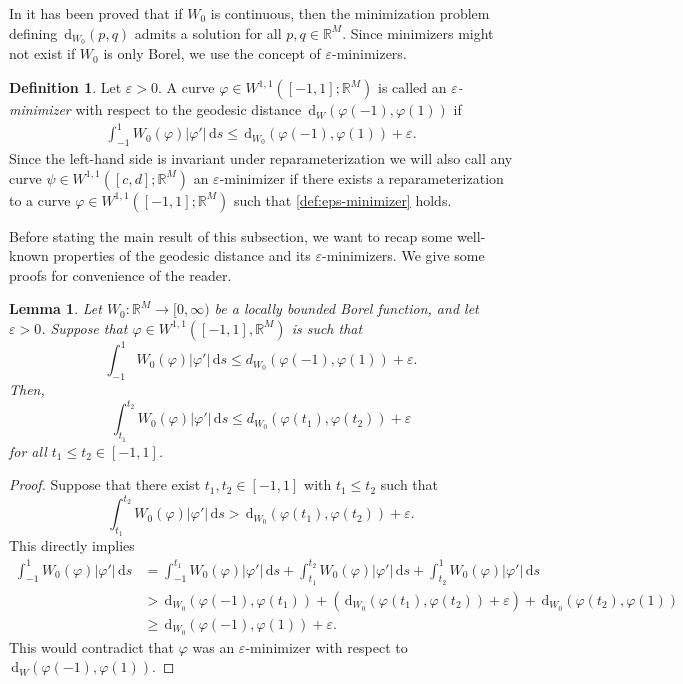\documentclass[a4paper, 11pt, reqno]{amsart}
\theoremstyle{plain}
\newtheorem{lemma}[theorem]{Lemma}
\theoremstyle{definition}
\newtheorem{definition}[theorem]{Definition}
\theoremstyle{remark}
\newcommand{\R}{\mathbb R}
\newcommand{\eps}{\varepsilon}
\newcommand{\dd}{\,\mathrm{d}}
\begin{document}
In \cite{ZunSter} it has been proved that if $W_0$ is continuous, then the minimization problem defining $\dd_{W_0} (p,q)$ admits a solution for all $p,q \in \R^M$.
Since minimizers might not exist if $W_0$ is only Borel, we use the concept of $\eps$-minimizers.

\begin{definition}
    Let $\varepsilon > 0$. A curve $\varphi \in W^{1,1}([-1,1]; \R^M)$ is called an \emph{$\eps$-minimizer} with respect to the geodesic distance $\dd_W(\varphi(-1), \varphi(1))$ if 
    \begin{align}\label{def:eps-minimizer}
        \int_{-1}^1 W_0(\varphi)|\varphi'|\,\mathrm{d}s \leq \dd_{W_0}(\varphi(-1), \varphi(1)) + \varepsilon.
    \end{align}
    Since the left-hand side is invariant under reparameterization we will also call any curve $\psi \in W^{1,1}([c,d]; \R^M)$ an $\eps$-minimizer if there exists a reparameterization to a curve $\varphi \in W^{1,1}([-1,1]; \R^M)$ such that \eqref{def:eps-minimizer} holds.
\end{definition}

Before stating the main result of this subsection, we want to recap some well-known properties of the geodesic distance and its $\eps$-minimizers. We give some proofs for convenience of the reader.

\begin{lemma}\label{lemma:almost_minimizers_have_locality_prop}
    Let $W_0: \R^M \to [0,\infty)$ be a locally bounded Borel function, and let $\eps > 0$. Suppose that $\varphi \in W^{1,1}([-1,1], \R^M)$ is such that
    \[
        \int_{-1}^1 W_0(\varphi)|\varphi'|\,\mathrm{d}s \leq d_{W_0}(\varphi(-1), \varphi(1)) + \eps.
    \]
    Then,  
    \[
        \int_{t_1}^{t_2} W_0(\varphi)|\varphi'|\,\mathrm{d}s \leq d_{W_0}(\varphi(t_1), \varphi(t_2)) + \eps
    \]
    for all $t_1 \leq t_2 \in [-1,1]$. 
\end{lemma}
\begin{proof}
    Suppose that there exist $t_1, t_2 \in [-1,1]$ with $t_1 \leq t_2$ such that
    \[
        \int_{t_1}^{t_2} W_0(\varphi)|\varphi'|\,\mathrm{d}s > \dd_{W_0}(\varphi(t_1), \varphi(t_2)) + \eps.
    \]
    This directly implies 
    \begin{align*}
        \int_{-1}^1 W_0(\varphi)|\varphi'|\,\mathrm{d}s &= \int_{-1}^{t_1} W_0(\varphi)|\varphi'|\,\mathrm{d}s + \int_{t_1}^{t_2} W_0(\varphi)|\varphi'|\,\mathrm{d}s + \int_{t_2}^{1} W_0(\varphi)|\varphi'|\,\mathrm{d}s \\
        & > \dd_{W_0}(\varphi(-1), \varphi(t_1))+ (\dd_{W_0}(\varphi(t_1), \varphi(t_2)) + \eps) + \dd_{W_0}(\varphi(t_2), \varphi(1)) \\
        & \geq \dd_{W_0}(\varphi(-1), \varphi(1)) + \eps.
    \end{align*}
    This would contradict that $\varphi$ was an $\eps$-minimizer with respect to $\dd_W(\varphi(-1), \varphi(1))$.
\end{proof}
\end{document}
